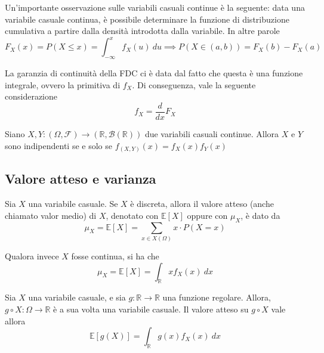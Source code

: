                 Un'importante osservazione sulle variabili casuali continue è la seguente: data una variabile casuale continua, è possibile determinare la funzione di distribuzione cumulativa a partire dalla densità introdotta dalla variabile.
                In altre parole
                \[
                    F_{X}(x) = P(X \leq x) = \int_{-\infty}^{x} f_{X}(u) \: du \implies P(X \in (a, b)) = F_{X}(b) - F_{X}(a)
                \]

                La garanzia di continuità della FDC ci è data dal fatto che questa è una funzione integrale, ovvero la primitiva di $f_{X}$.
                Di conseguenza, vale la seguente considerazione
                \[
                    f_{X} = \frac{d}{dx} F_{X}
                \]

                \begin{theorem}
                    Siano $X, Y: (\Omega, \mathcal{F}) \rightarrow (\mathbb{R}, \mathcal{B}(\mathbb{R}))$ due variabili casuali continue.
                    Allora $X$ e $Y$ sono indipendenti se e solo se $f_{(X, Y)}(x) = f_{X}(x)f_{Y}(x)$
                \end{theorem}

        \subsection{Valore atteso e varianza}
            \begin{definition}
                Sia $X$ una variabile casuale.
                Se $X$ è discreta, allora il valore atteso (anche chiamato valor medio) di $X$, denotato con $\mathbb{E}[X]$ oppure con $\mu_{X}$, è dato da
                \[
                    \mu_{X} = \mathbb{E}[X] = \sum_{x \in X(\Omega)} x \cdot P(X = x)
                \]

                Qualora invece $X$ fosse continua, si ha che
                \[
                    \mu_{X} = \mathbb{E}[X] = \int_{\mathbb{R}} x f_{X}(x) \: dx
                \]
            \end{definition}

            \begin{theorem}
                Sia $X$ una variabile casuale, e sia $g: \mathbb{R} \rightarrow \mathbb{R}$ una funzione regolare.
                Allora, $g \circ X: \Omega \rightarrow \mathbb{R}$ è a sua volta una variabile casuale.
                Il valore atteso su $g \circ X$ vale allora
                \[
                    \mathbb{E}[g(X)] = \int_{\mathbb{R}} g(x) f_{X}(x) \: dx
                \]
            \end{theorem}

